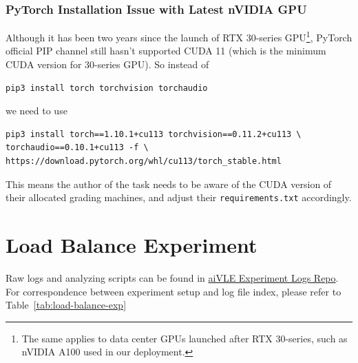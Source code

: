 \documentclass[fyp]{socreport}
\newenvironment{code}{\captionsetup{type=listing}}{}
\begin{document}
\subsubsection{PyTorch Installation Issue with Latest nVIDIA GPU}
Although it has been two years since the launch of RTX 30-series GPU\footnote{The same applies to data center GPUs launched after RTX 30-series, such as nVIDIA A100 used in our deployment.}, PyTorch official PIP channel still hasn't supported CUDA 11 (which is the minimum CUDA version for 30-series GPU). So instead of 
\begin{code}
\begin{verbatim}
pip3 install torch torchvision torchaudio
\end{verbatim}
\end{code}
we need to use
\begin{code}
\begin{verbatim}
pip3 install torch==1.10.1+cu113 torchvision==0.11.2+cu113 \
torchaudio==0.10.1+cu113 -f \
https://download.pytorch.org/whl/cu113/torch_stable.html
\end{verbatim}
\end{code}

This means the author of the task needs to be aware of the CUDA version of their allocated grading machines, and adjust their \texttt{requirements.txt} accordingly.

\section{Load Balance Experiment}
\label{s:load-balance-exp}
Raw logs and analyzing scripts can be found in \href{https://github.com/edu-ai/aivle-experiment-logs}{aiVLE Experiment Logs Repo}. For correspondence between experiment setup and log file index, please refer to Table~\ref{tab:load-balance-exp}
\end{document}
